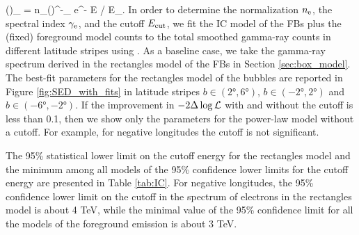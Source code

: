 \be 
\label{eq:e_spectrum}
\left(\right)_{\!\!\el} = n_\el \left(\right)^{-\gamma_\el} e^{- E / E_{\cut}}.
\ee
In order to determine the normalization $n_{\text{e}}$, the spectral index $\gamma_{\text{e}}$, and the cutoff  $E_{\text{cut}}$, 
we fit the IC model of the FBs plus the (fixed) foreground model counts to the 
total smoothed gamma-ray counts in different latitude stripes using .
As a baseline case, we take the gamma-ray spectrum derived in the rectangles model of the FBs in Section \ref{sec:box_model}.
The best-fit parameters for the rectangles model of the bubbles are reported in Figure \ref{fig:SED_with_fits}
in latitude stripes $b \in (\ang{2}, \ang{6})$, $b \in (-\ang{2}, \ang{2})$ and $b \in (-\ang{6}, -\ang{2})$. 
If the improvement in $-2 \Delta \log {\mathcal{L}}$ with and without the cutoff is less than 0.1, then we show only the parameters for the power-law model without a cutoff.
For example, for negative longitudes the cutoff is not significant.

The 95\% statistical lower limit on the cutoff energy for the rectangles model and the minimum among all models of the 95\% confidence lower limits for the cutoff energy
are presented in Table \ref{tab:IC}.
For negative longitudes,
the 95\% confidence lower limit on the cutoff in the spectrum of electrons in the rectangles model is about 4 TeV,
while the minimal value of the 95\% confidence limit for all the models of the foreground emission is about 3 TeV.

